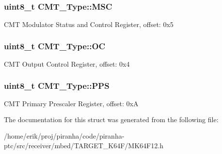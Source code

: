 \subsubsection[{\texorpdfstring{M\+SC}{MSC}}]{ uint8\+\_\+t C\+M\+T\+\_\+\+Type\+::\+M\+SC}\hypertarget{structCMT__Type_ad5c3e74ab287959da1599060c679921d}{}\label{structCMT__Type_ad5c3e74ab287959da1599060c679921d}
C\+MT Modulator Status and Control Register, offset\+: 0x5 
\subsubsection[{\texorpdfstring{OC}{OC}}]{ uint8\+\_\+t C\+M\+T\+\_\+\+Type\+::\+OC}\hypertarget{structCMT__Type_a6cde86fd27edc5afb37125c287441749}{}\label{structCMT__Type_a6cde86fd27edc5afb37125c287441749}
C\+MT Output Control Register, offset\+: 0x4 
\subsubsection[{\texorpdfstring{P\+PS}{PPS}}]{ uint8\+\_\+t C\+M\+T\+\_\+\+Type\+::\+P\+PS}\hypertarget{structCMT__Type_a1be46f15eb27794c060113a409fce3ac}{}\label{structCMT__Type_a1be46f15eb27794c060113a409fce3ac}
C\+MT Primary Prescaler Register, offset\+: 0xA 

The documentation for this struct was generated from the following file\+:\begin{DoxyCompactItemize}
\item 
/home/erik/proj/piranha/code/piranha-\/ptc/src/receiver/mbed/\+T\+A\+R\+G\+E\+T\+\_\+\+K64\+F/M\+K64\+F12.\+h\end{DoxyCompactItemize}
